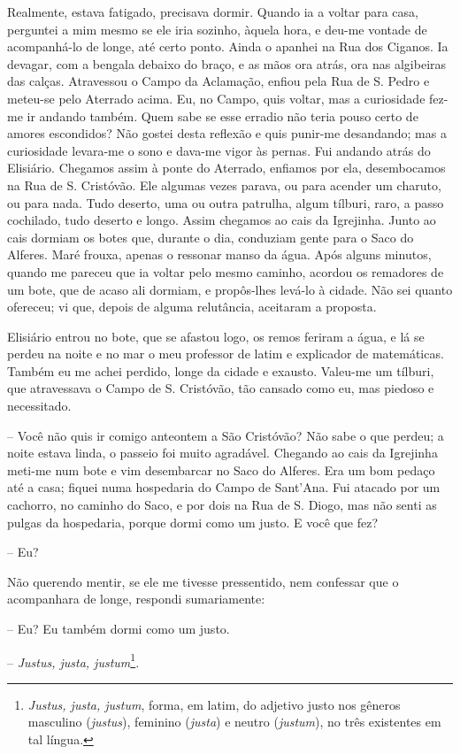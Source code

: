 Realmente, estava fatigado, precisava dormir. Quando ia a voltar para
casa, perguntei a mim mesmo se ele iria sozinho, àquela hora, e deu-me
vontade de acompanhá-lo de longe, até certo ponto. Ainda o apanhei na
Rua dos Ciganos. Ia devagar, com a bengala debaixo do braço, e as mãos
ora atrás, ora nas algibeiras das calças. Atravessou o Campo da
Aclamação, enfiou pela Rua de S. Pedro e meteu-se pelo Aterrado acima.
Eu, no Campo, quis voltar, mas a curiosidade fez-me ir andando também.
Quem sabe se esse erradio não teria pouso certo de amores escondidos?
Não gostei desta reflexão e quis punir-me desandando; mas a curiosidade
levara-me o sono e dava-me vigor às pernas. Fui andando atrás do
Elisiário. Chegamos assim à ponte do Aterrado, enfiamos por ela,
desembocamos na Rua de S. Cristóvão. Ele algumas vezes parava, ou para
acender um charuto, ou para nada. Tudo deserto, uma ou outra patrulha,
algum tílburi, raro, a passo cochilado, tudo deserto e longo. Assim
chegamos ao cais da Igrejinha. Junto ao cais dormiam os botes que,
durante o dia, conduziam gente para o Saco do Alferes. Maré frouxa,
apenas o ressonar manso da água. Após alguns minutos, quando me pareceu
que ia voltar pelo mesmo caminho, acordou os remadores de um bote, que
de acaso ali dormiam, e propôs-lhes levá-lo à cidade. Não sei quanto
ofereceu; vi que, depois de alguma relutância, aceitaram a proposta.

Elisiário entrou no bote, que se afastou logo, os remos feriram a água,
e lá se perdeu na noite e no mar o meu professor de latim e explicador
de matemáticas. Também eu me achei perdido, longe da cidade e exausto.
Valeu-me um tílburi, que atravessava o Campo de S. Cristóvão, tão
cansado como eu, mas piedoso e necessitado.

-- Você não quis ir comigo anteontem a São Cristóvão? Não sabe o que
perdeu; a noite estava linda, o passeio foi muito agradável. Chegando ao
cais da Igrejinha meti-me num bote e vim desembarcar no Saco do Alferes.
Era um bom pedaço até a casa; fiquei numa hospedaria do Campo de
Sant'Ana. Fui atacado por um cachorro, no caminho do Saco, e por dois na
Rua de S. Diogo, mas não senti as pulgas da hospedaria, porque dormi
como um justo. E você que fez?

-- Eu?

Não querendo mentir, se ele me tivesse pressentido, nem confessar que o
acompanhara de longe, respondi sumariamente:

-- Eu? Eu também dormi como um justo.

-- \emph{Justus, justa, justum}\footnote{\emph{Justus, justa, justum},
  forma, em latim, do adjetivo justo nos gêneros masculino
  (\emph{justus}), feminino (\emph{justa}) e neutro (\emph{justum}), no
  três existentes em tal língua.}.

